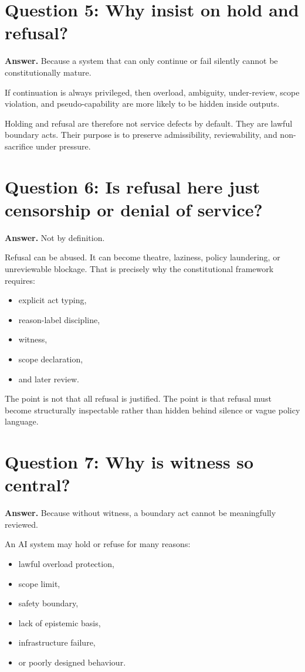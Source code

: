 \documentclass[11pt]{article}
\begin{document}
\section{Question 5: Why insist on hold and refusal?}

\textbf{Answer.} Because a system that can only continue or fail silently cannot be constitutionally mature.

If continuation is always privileged, then overload, ambiguity, under-review, scope violation, and pseudo-capability are more likely to be hidden inside outputs.

Holding and refusal are therefore not service defects by default. They are lawful boundary acts. Their purpose is to preserve admissibility, reviewability, and non-sacrifice under pressure.

\section{Question 6: Is refusal here just censorship or denial of service?}

\textbf{Answer.} Not by definition.

Refusal can be abused. It can become theatre, laziness, policy laundering, or unreviewable blockage. That is precisely why the constitutional framework requires:
\begin{itemize}[leftmargin=2em]
    \item explicit act typing,
    \item reason-label discipline,
    \item witness,
    \item scope declaration,
    \item and later review.
\end{itemize}

The point is not that all refusal is justified. The point is that refusal must become structurally inspectable rather than hidden behind silence or vague policy language.

\section{Question 7: Why is witness so central?}

\textbf{Answer.} Because without witness, a boundary act cannot be meaningfully reviewed.

An AI system may hold or refuse for many reasons:
\begin{itemize}[leftmargin=2em]
    \item lawful overload protection,
    \item scope limit,
    \item safety boundary,
    \item lack of epistemic basis,
    \item infrastructure failure,
    \item or poorly designed behaviour.
\end{itemize}
\end{document}
